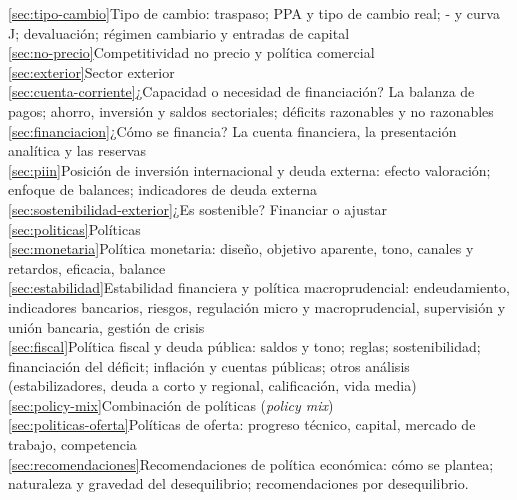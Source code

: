 \documentclass[11pt]{article}
\begin{document}
\begin{esquema}[title={Esquema de la guía},fontupper=\footnotesize]
\hspace*{1.5em}\ref{sec:tipo-cambio}\enspace Tipo de cambio: traspaso; PPA y tipo de cambio real; - y curva J; devaluación; régimen cambiario y entradas de capital\\
\hspace*{1.5em}\ref{sec:no-precio}\enspace Competitividad no precio y política comercial\\
\ref{sec:exterior}\enspace Sector exterior\\
\hspace*{1.5em}\ref{sec:cuenta-corriente}\enspace ¿Capacidad o necesidad de financiación? La balanza de pagos; ahorro, inversión y saldos sectoriales; déficits razonables y no razonables\\
\hspace*{1.5em}\ref{sec:financiacion}\enspace ¿Cómo se financia? La cuenta financiera, la presentación analítica y las reservas\\
\hspace*{1.5em}\ref{sec:piin}\enspace Posición de inversión internacional y deuda externa: efecto valoración; enfoque de balances; indicadores de deuda externa\\
\hspace*{1.5em}\ref{sec:sostenibilidad-exterior}\enspace ¿Es sostenible? Financiar o ajustar\\
\ref{sec:politicas}\enspace Políticas\\
\hspace*{1.5em}\ref{sec:monetaria}\enspace Política monetaria: diseño, objetivo aparente, tono, canales y retardos, eficacia, balance\\
\hspace*{1.5em}\ref{sec:estabilidad}\enspace Estabilidad financiera y política macroprudencial: endeudamiento, indicadores bancarios, riesgos, regulación micro y macroprudencial, supervisión y unión bancaria, gestión de crisis\\
\hspace*{1.5em}\ref{sec:fiscal}\enspace Política fiscal y deuda pública: saldos y tono; reglas; sostenibilidad; financiación del déficit; inflación y cuentas públicas; otros análisis (estabilizadores, deuda a corto y regional, calificación, vida media)\\
\hspace*{1.5em}\ref{sec:policy-mix}\enspace Combinación de políticas (\emph{policy mix})\\
\hspace*{1.5em}\ref{sec:politicas-oferta}\enspace Políticas de oferta: progreso técnico, capital, mercado de trabajo, competencia\\
\ref{sec:recomendaciones}\enspace Recomendaciones de política económica: cómo se plantea; naturaleza y gravedad del desequilibrio; recomendaciones por desequilibrio.
\end{esquema}
\nocite{VichGadella2007Guia,GuiaDictamenJLCT,Sahuquillo2023,CuadradoRoura2015,FMI2013CaseStudy,FMI2022edXFPP,Afi2022Jornada}
\end{document}
